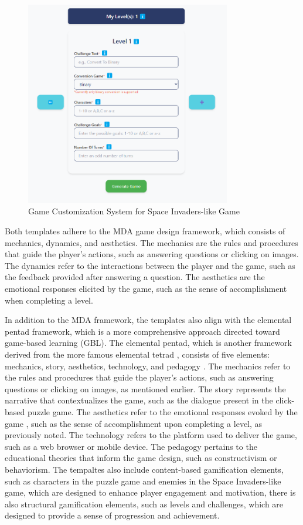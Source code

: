 \begin{figure}
	\centering
	\includegraphics[width=0.8\textwidth]{figures/Space_Invaders/old.png}
	\caption{Game Customization System for Space Invaders-like Game}
	\label{fig:customizationSpaceInvaders}
\end{figure}

Both templates adhere to the MDA \cite{MDA2004} game design framework, which consists of mechanics, dynamics, and aesthetics. The mechanics are the rules and procedures that guide the player's actions, such as answering questions or clicking on images. The dynamics refer to the interactions between the player and the game, such as the feedback provided after answering a question. The aesthetics are the emotional responses elicited by the game, such as the sense of accomplishment when completing a level.

In addition to the MDA framework, the templates also align with the elemental pentad framework, which is a more comprehensive approach directed toward game-based learning (GBL). The elemental pentad, which is another framework derived from the more famous elemental tetrad \cite{tetrad2011}, consists of five elements: mechanics, story, aesthetics, technology, and pedagogy \cite{ahmad2019}. The mechanics refer to the rules and procedures that guide the player's actions, such as answering questions or clicking on images, as mentioned earlier. The story represents the narrative that contextualizes the game, such as the dialogue present in the click-based puzzle game. The aesthetics refer to the emotional responses evoked by the game \cite{MDA2004}, such as the sense of accomplishment upon completing a level, as previously noted. The technology refers to the platform used to deliver the game, such as a web browser or mobile device. The pedagogy pertains to the educational theories that inform the game design, such as constructivism or behaviorism. The tempaltes also include content-based gamification elements, such as characters in the puzzle game and enemies in the Space Invaders-like game, which are designed to enhance player engagement and motivation, there is also structural gamification elements, such as levels and challenges, which are designed to provide a sense of progression and achievement. 

